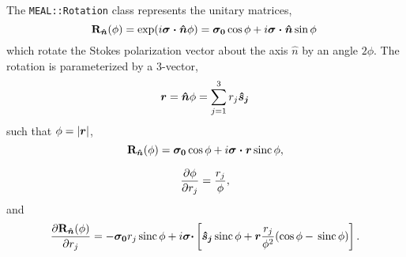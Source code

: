 \documentclass[12pt]{article}
\newcommand{\mbf}[1]{\mbox{\boldmath $#1$}}
\newcommand{\mbfs}[1]{\mbox{\scriptsize\boldmath $#1$}}
\newcommand{\Ci}{\ensuremath{i}}
\newcommand{\sinc}{\,{\rm sinc}\,}
\newcommand{\Rotation}{{\bf R}}
\newcommand{\vRotation}[1][n]{\ensuremath{\Rotation_{\mbfs{\hat #1}}}}
\newcommand{\rotat}{\ensuremath{\vRotation(\phi)}}
\newcommand{\pauli}[1]{\mbf{\sigma_{#1}}}
\begin{document}
\noindent
The {\tt MEAL::Rotation} class represents the unitary matrices,
\begin{equation}
\label{eqn:Rotation}
\rotat = \exp (\Ci\mbf{\sigma\cdot\hat{n}}\phi)
       = \pauli{0}\cos\phi + \Ci\mbf{\sigma\cdot\hat{n}}\sin\phi\,
\end{equation}
which rotate the Stokes polarization vector about the axis
\mbf{\hat{n}} by an angle $2\phi$.  The rotation is parameterized by a
3-vector,
\begin{equation}
\mbf{r}=\mbf{\hat{n}}\phi = \sum_{j=1}^3 r_j \mbf{\hat{s}_j}
\end{equation}
such that $\phi=|\mbf{r}|$,
\begin{equation}
\rotat = \pauli{0}\cos\phi + \Ci\mbf{\sigma\cdot r}\sinc\phi,
\end{equation}

\begin{equation}
{\partial\phi\over\partial r_j} = {r_j\over\phi},
\end{equation}
and
\begin{equation}
{\partial\rotat\over\partial r_j} = -\pauli{0}r_j\sinc\phi 
+ \Ci \mbf{\sigma\cdot}\left[ \mbf{\hat{s}_j}\sinc\phi + \mbf{r} {r_j\over\phi^2} (\cos\phi -\sinc\phi)\right].
\end{equation}
\end{document}
